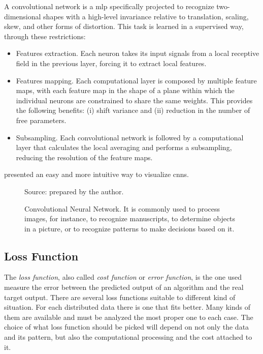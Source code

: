 A convolutional network is a \gls*{mlp} specifically projected to recognize two-dimensional shapes with a high-level invariance relative to translation, scaling, skew, and other forms of distortion. This task is learned in a supervised way, through these restrictions:
%
\begin{itemize}
    \item Features extraction. Each neuron takes its input signals from a local receptive field in the previous layer, forcing it to extract local features.
    \item Features mapping. Each computational layer is composed by multiple feature maps, with each feature map in the shape of a plane within which the individual neurons are constrained to share the same weights. This provides the following benefits: (i) shift variance and (ii) reduction in the number of free parameters.
    \item Subsampling. Each convolutional network is followed by a computational layer that calculates the local averaging and performs a subsampling, reducing the resolution of the feature maps.
\end{itemize}
%
\citet{wang2021} presented an easy and more intuitive way to visualize \gls*{cnn}s.
%
\begin{figure}[!htb]
    \centering
    \caption[Convolutional Neural Network]{Convolutional Neural Network. It is commonly used to process images, for instance, to recognize manuscripts, to determine objects in a picture, or to recognize patterns to make decisions based on it.}
    
    
    {\footnotesize Source: prepared by the author.}
\end{figure}



\subsection{Loss Function}\label{sec:loss_function}

The \emph{loss function}, also called \emph{cost function} or \emph{error function}, is the one used measure the error between the predicted output of an algorithm and the real target output. 
There are several loss functions suitable to different kind of situation. 
For each distributed data there is one that fits better.
Many kinds of them are available and must be analyzed the most proper one to each case. 
The choice of what loss function should be picked will depend on not only the data and its pattern, but also the computational processing and the cost attached to it.

